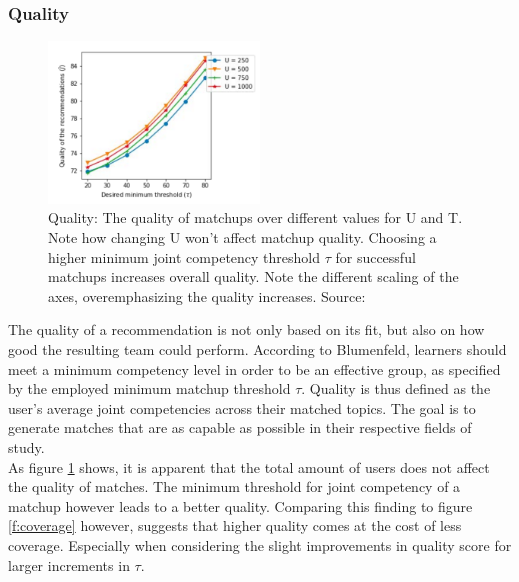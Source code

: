 \documentclass[conference]{IEEEtran}
\begin{document}
\subsubsection{Quality} \label{paper:quality}
\begin{figure}[!t]
	\centering
	\includegraphics[width=0.5\textwidth]{g/QualityByU.PNG}
	\caption{Quality: The quality of matchups over different values for U and T. Note how changing U won't affect matchup quality. Choosing a higher minimum joint competency threshold \(\tau\) for successful matchups increases overall quality. Note the different scaling of the axes, overemphasizing the quality increases. Source: \cite{potts2018reciprocal}}
	\label{f:quality}
\end{figure}
The quality of a recommendation is not only based on its fit, but also on how good the resulting team could perform. According to Blumenfeld, learners should meet a minimum competency level in order to be an effective group, as specified by the employed minimum matchup threshold \(\tau\). \cite{blumenfeld1996learning} Quality is thus defined as the user's average joint competencies across their matched topics. The goal is to generate matches that are as capable as possible in their respective fields of study.\\
As figure \ref{f:quality} shows, it is apparent that the total amount of users does not affect the quality of matches. The minimum threshold for joint competency of a matchup however leads to a better quality. Comparing this finding to figure \ref{f:coverage} however, suggests that higher quality comes at the cost of less coverage. Especially when considering the slight improvements in quality score for larger increments in \(\tau\).\\
\end{document}
